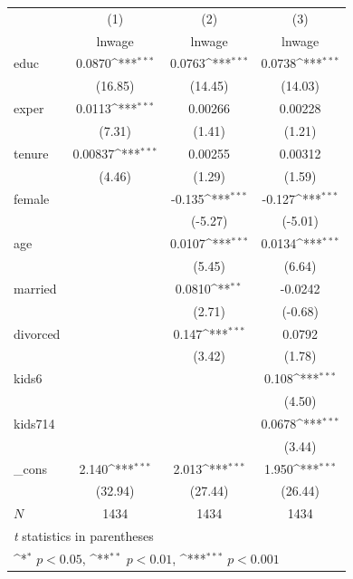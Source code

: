 \def\sym#1{\ifmmode^{#1}\else\(^{#1}\)\fi}
\begin{tabular}{l*{3}{c}}
\hline\hline
            &\multicolumn{1}{c}{(1)}&\multicolumn{1}{c}{(2)}&\multicolumn{1}{c}{(3)}\\
            &\multicolumn{1}{c}{lnwage}&\multicolumn{1}{c}{lnwage}&\multicolumn{1}{c}{lnwage}\\
\hline
educ        &      0.0870\sym{***}&      0.0763\sym{***}&      0.0738\sym{***}\\
            &     (16.85)         &     (14.45)         &     (14.03)         \\
[1em]
exper       &      0.0113\sym{***}&     0.00266         &     0.00228         \\
            &      (7.31)         &      (1.41)         &      (1.21)         \\
[1em]
tenure      &     0.00837\sym{***}&     0.00255         &     0.00312         \\
            &      (4.46)         &      (1.29)         &      (1.59)         \\
[1em]
female      &                     &      -0.135\sym{***}&      -0.127\sym{***}\\
            &                     &     (-5.27)         &     (-5.01)         \\
[1em]
age         &                     &      0.0107\sym{***}&      0.0134\sym{***}\\
            &                     &      (5.45)         &      (6.64)         \\
[1em]
married     &                     &      0.0810\sym{**} &     -0.0242         \\
            &                     &      (2.71)         &     (-0.68)         \\
[1em]
divorced    &                     &       0.147\sym{***}&      0.0792         \\
            &                     &      (3.42)         &      (1.78)         \\
[1em]
kids6       &                     &                     &       0.108\sym{***}\\
            &                     &                     &      (4.50)         \\
[1em]
kids714     &                     &                     &      0.0678\sym{***}\\
            &                     &                     &      (3.44)         \\
[1em]
\_cons      &       2.140\sym{***}&       2.013\sym{***}&       1.950\sym{***}\\
            &     (32.94)         &     (27.44)         &     (26.44)         \\
\hline
\(N\)       &        1434         &        1434         &        1434         \\
\hline\hline
\multicolumn{4}{l}{\footnotesize \textit{t} statistics in parentheses}\\
\multicolumn{4}{l}{\footnotesize \sym{*} \(p<0.05\), \sym{**} \(p<0.01\), \sym{***} \(p<0.001\)}\\
\end{tabular}
